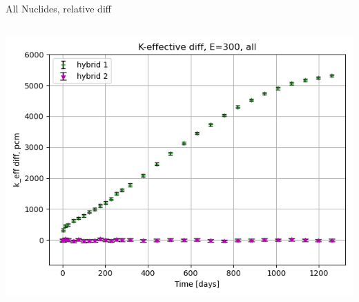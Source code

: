 \documentclass[
	11pt, %
	aspectratio=169, %
]{beamer}
\begin{document}
\begin{frame}{All Nuclides, relative diff}
	\begin{columns}[c] %
		\begin{column}{0.39\textwidth}
			\includegraphics[width=\textwidth]{../figures/keff/keff_all_300_diff.png}


\end{column}
\end{columns}
\end{frame}
\end{document}

